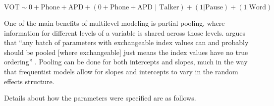 \begin{equation}\label{ch4:num:formula}
  \text{VOT} \sim 0 + \text{Phone} + \text{APD} + (0 + \text{Phone} + \text{APD }|\text{ Talker}) + (1 | \text{Pause}) + (1 | \text{Word})
\end{equation}



One of the main benefits of multilevel modeling is partial pooling, where information for different levels of a variable is shared across those levels. \citeauthor{mcelreath_2020_sr} argues that ``any batch of parameters with exchangeable index values can and probably should be pooled [where exchangeable] just means the index values have no true ordering'' \citeyearpar[][p. 435]{mcelreath_2020_sr}. Pooling can be done for both intercepts and slopes, much in the way that frequentist models allow for slopes and intercepts to vary in the random effects structure. 

Details about how the parameters were specified are as follows.  

